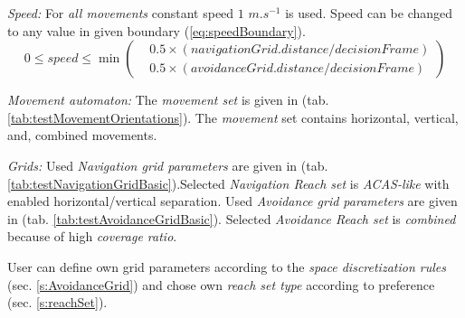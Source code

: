     \emph{Speed:} For \emph{all movements} constant speed $1$ $m.s^{-1}$ is used. Speed can be changed to any value in given boundary (\ref{eq:speedBoundary}).
        \begin{equation}\label{eq:speedBoundary}
            0 \le speed    \le 
            \min\left(
            \begin{aligned}
                & 0.5\times(navigationGrid.distance/decisionFrame)\\
                & 0.5\times(avoidanceGrid.distance/decisionFrame)
            \end{aligned}
            \right)
        \end{equation}
    
    
    \emph{Movement automaton:} The \emph{movement set} is given in (tab. \ref{tab:testMovementOrientations}). The \emph{movement} set contains horizontal, vertical, and, combined movements. 
    
    \emph{Grids:} Used \emph{Navigation grid parameters} are given in (tab. \ref{tab:testNavigationGridBasic}).Selected \emph{Navigation Reach set} is \emph{ACAS-like} with enabled horizontal/vertical separation. Used \emph{Avoidance grid parameters} are given in (tab. \ref{tab:testAvoidanceGridBasic}). Selected \emph{Avoidance Reach set} is \emph{combined} because of high \emph{coverage ratio}. 
    
    User can define own grid parameters according to the \emph{space discretization rules} (sec. \ref{s:AvoidanceGrid}) and chose own \emph{reach set type} according to preference (sec. \ref{s:reachSet}).
    
